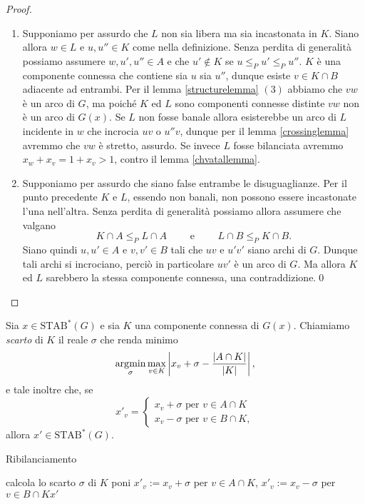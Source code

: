 \begin{proof}
	\begin{enumerate}
		\item Supponiamo per assurdo che \(L\) non sia libera ma sia incastonata in \(K\). Siano allora \(w\in L\) e \(u,u''\in K\) come nella definizione. Senza perdita di generalità possiamo assumere \(w,u',u''\in A\) e che \(u'\not\in K\) se \(u\le_{P}u'\le_{P}u''\). \(K\) \`e una componente connessa che contiene sia \(u\) sia \(u''\), dunque esiste \(v\in K\cap B\) adiacente ad entrambi. Per il lemma \ref{structurelemma} \((3)\) abbiamo che \(vw\) \`e un arco di \(G\), ma poich\'e \(K\) ed \(L\) sono componenti connesse distinte \(vw\) non \`e un arco di \(G(x)\). Se \(L\) non fosse banale allora esisterebbe un arco di \(L\) incidente in \(w\) che incrocia \(uv\) o \(u''v\), dunque per il lemma \ref{crossinglemma} avremmo che \(vw\) \`e stretto, assurdo. Se invece \(L\) fosse bilanciata avremmo \(x_w+x_v=1+x_v>1\), contro il lemma \ref{chvatallemma}. 
		\item Supponiamo per assurdo che siano false entrambe le disuguaglianze. Per il punto precedente \(K\) e \(L\), essendo non banali, non possono essere incastonate l'una nell'altra. Senza perdita di generalità possiamo allora assumere che valgano
		\[K\cap A\le_{P}L\cap A\qquad\text{ e }\qquad L\cap B\le_{P}K\cap B.\]
		Siano quindi \(u,u'\in A\) e \(v,v'\in B\) tali che \(uv\) e \(u'v'\) siano archi di \(G\). Dunque tali archi si incrociano, perciò in particolare \(uv'\) è un arco di \(G\). Ma allora \(K\) ed \(L\) sarebbero la stessa componente connessa, una contraddizione.\qed 
	\end{enumerate}
\end{proof}
\begin{definition}
	Sia \(x\in \text{STAB}^*(G)\) e sia \(K\) una componente connessa di \(G(x)\). Chiamiamo \emph{scarto} di \(K\) il reale \(\sigma\) che renda minimo
	\[\operatorname*{\arg\!\min}_{\sigma}\max_{v\in K}\left|x_v+\sigma-\frac{|A\cap K|}{|K|}\right|,\]
	e tale inoltre che, se
	\[ x'_v = 
	\begin{cases}
		x_v + \sigma \text{ per } v\in A\cap K\\
		x_v - \sigma \text{ per } v\in B\cap K, 
	\end{cases}
	\]
	allora \(x'\in \text{STAB}^*(G)\). 
\end{definition}
\begin{algorithm}
	\caption{Ribilanciamento} \label{rebalance} 
	\begin{algorithmic}
		[1]  \STATE calcola lo scarto \(\sigma\) di \(K\) \STATE poni \(x'_v := x_v+\sigma\) per \(v\in A\cap K\), \(x'_v := x_v-\sigma\) per \(v\in B\cap K\)\ENDWHILE \RETURN \(x'\) 
	\end{algorithmic}
\end{algorithm}

